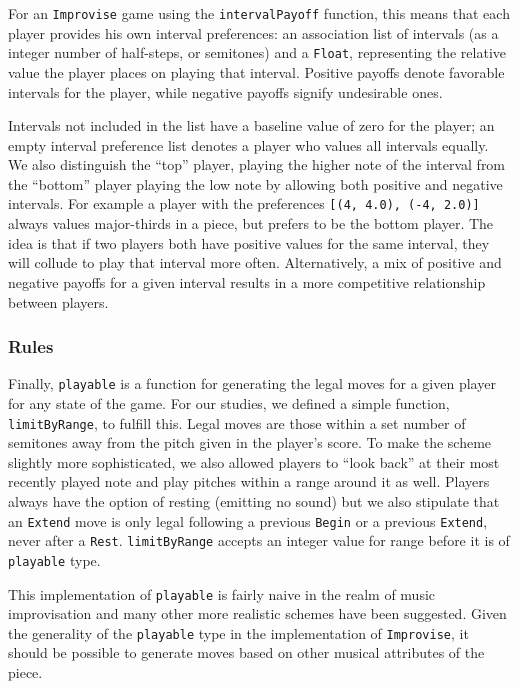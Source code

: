\documentclass{article}
\begin{document}
For an \texttt{Improvise} game using the \texttt{intervalPayoff} function, this
means that each player provides his own interval preferences: an
association list of intervals (as a integer number of half-steps, or
semitones) and a \texttt{Float}, representing the relative value the player
places on playing that interval. Positive payoffs denote favorable
intervals for the player, while negative payoffs signify undesirable
ones.

Intervals not included in the list have a baseline value of zero for the
player; an empty interval preference list denotes a player who values
all intervals equally. We also distinguish the ``top'' player, playing
the higher note of the interval from the ``bottom'' player playing the
low note by allowing both positive and negative intervals. For example a
player with the preferences \texttt{{[}(4, 4.0), (-4, 2.0){]}} always
values major-thirds in a piece, but prefers to be the bottom player. The
idea is that if two players both have positive values for the same
interval, they will collude to play that interval more often.
Alternatively, a mix of positive and negative payoffs for a given
interval results in a more competitive relationship between players.

\subsubsection{Rules}
Finally, \texttt{playable} is a function for generating the legal moves
for a given player for any state of the game. 
For our studies, we defined a simple function, \texttt{limitByRange}, to fulfill this.
Legal moves are those within a
set number of semitones away from the pitch given in the player's score. 
To make the scheme slightly more sophisticated, we also allowed players to ``look
back'' at their most recently played note and play pitches within a
range around it as well. Players always have the option of
resting (emitting no sound) but we also stipulate that an \texttt{Extend} move is
only legal following a previous \texttt{Begin} or a previous \texttt{Extend}, never after
a \texttt{Rest}.  \texttt{limitByRange} accepts an integer value for range before it is of \texttt{playable} type.

This implementation of \texttt{playable} is fairly naive in the realm of music
improvisation and many other more realistic schemes have been suggested.
Given the generality of the \texttt{playable} type in the
implementation of \texttt{Improvise}, it should be possible to generate moves
based on other musical attributes of the piece.
\end{document}
